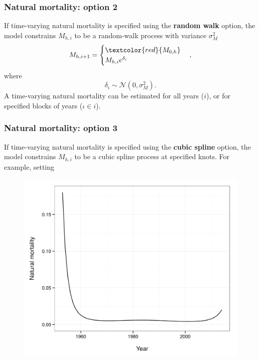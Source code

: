 \documentclass{beamer}
\begin{document}
\begin{frame}
\frametitle{Natural mortality: option 2}
If time-varying natural mortality is specified using the {\bf random walk}
option, the model constrains $M_{h,i}$ to be a random-walk process with variance
$\sigma^2_M$
\begin{equation*}
  M_{h,i+1} = 
  \begin{cases}
    \textcolor{red}{M_{0,h}} \\
    M_{h,i} e^{\delta_i}
  \end{cases},
\end{equation*}
where
\begin{equation*}
  \delta_i \sim \mathcal{N} \left( 0, \sigma^2_M \right).
\end{equation*}
A time-varying natural mortality can be estimated for all years ($i$), or for
specified blocks of years ($\iota \in i$).
\begin{figure}[!htbp]
  \centering
\end{figure}
\end{frame}


\begin{frame}
\frametitle{Natural mortality: option 3}
If time-varying natural mortality is specified using the {\bf cubic spline}
option, the model constrains $M_{h,i}$ to be a cubic spline process at
specified knots. For example, setting
\begin{figure}[!htbp]
  \centering
  \includegraphics[width=0.65\linewidth]{figure/M_t_spline.png}
\end{figure}
\end{frame}

\end{document}
